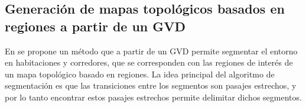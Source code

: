 

\subsection{Generación de mapas topológicos basados en regiones a partir de un GVD}\label{subsec:mapaTopGVD}
En \cite{Thrun1998} se propone un método que a partir de un GVD permite
segmentar el entorno en
habitaciones y corredores, que se corresponden con las 
regiones de interés de un mapa topológico basado en regiones. La idea principal del
algoritmo de segmentación es que las transiciones entre los segmentos son
pasajes estrechos, y por lo tanto encontrar estos pasajes estrechos permite
delimitar dichos segmentos.


